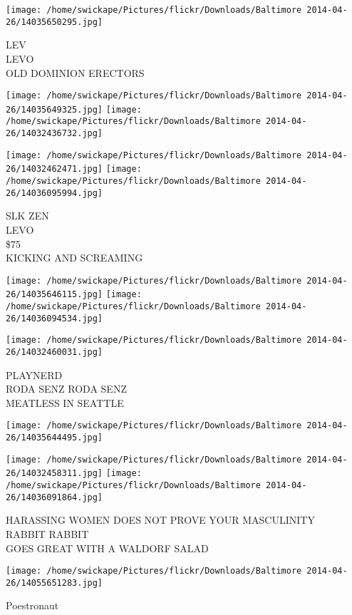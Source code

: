 \documentclass[10pt,letterpaper]{article}
\begin{document}
\vspace{0.25in}
\texttt{[image: /home/swickape/Pictures/flickr/Downloads/Baltimore 2014-04-26/14035650295.jpg]}

LEV\\
LEVO\\
OLD DOMINION ERECTORS
\pagebreak

\texttt{[image: /home/swickape/Pictures/flickr/Downloads/Baltimore 2014-04-26/14035649325.jpg]}
\texttt{[image: /home/swickape/Pictures/flickr/Downloads/Baltimore 2014-04-26/14032436732.jpg]}

\texttt{[image: /home/swickape/Pictures/flickr/Downloads/Baltimore 2014-04-26/14032462471.jpg]}
\texttt{[image: /home/swickape/Pictures/flickr/Downloads/Baltimore 2014-04-26/14036095994.jpg]}

SLK ZEN\\
LEVO\\
\$75\\
KICKING AND SCREAMING
\pagebreak

\texttt{[image: /home/swickape/Pictures/flickr/Downloads/Baltimore 2014-04-26/14035646115.jpg]}
\texttt{[image: /home/swickape/Pictures/flickr/Downloads/Baltimore 2014-04-26/14036094534.jpg]}

\texttt{[image: /home/swickape/Pictures/flickr/Downloads/Baltimore 2014-04-26/14032460031.jpg]}

PLAYNERD\\
RODA SENZ RODA SENZ\\
MEATLESS IN SEATTLE
\pagebreak

\texttt{[image: /home/swickape/Pictures/flickr/Downloads/Baltimore 2014-04-26/14035644495.jpg]}

\vspace{0.25in}
\texttt{[image: /home/swickape/Pictures/flickr/Downloads/Baltimore 2014-04-26/14032458311.jpg]}
\texttt{[image: /home/swickape/Pictures/flickr/Downloads/Baltimore 2014-04-26/14036091864.jpg]}

HARASSING WOMEN DOES NOT PROVE YOUR MASCULINITY\\
RABBIT RABBIT\\
GOES GREAT WITH A WALDORF SALAD
\pagebreak

\texttt{[image: /home/swickape/Pictures/flickr/Downloads/Baltimore 2014-04-26/14055651283.jpg]}

Poestronaut
\pagebreak
\end{document}
